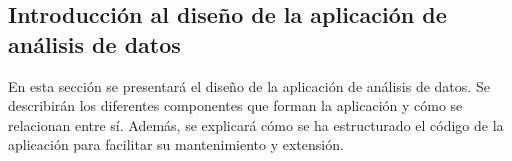 \subsection{Introducción al diseño de la aplicación de análisis de datos}
\label{sec:diseno-introduccion}

En esta sección se presentará el diseño de la aplicación de análisis de datos. Se describirán los diferentes componentes 
que forman la aplicación y cómo se relacionan entre sí. Además, se explicará cómo se ha estructurado el código de la aplicación
para facilitar su mantenimiento y extensión.

